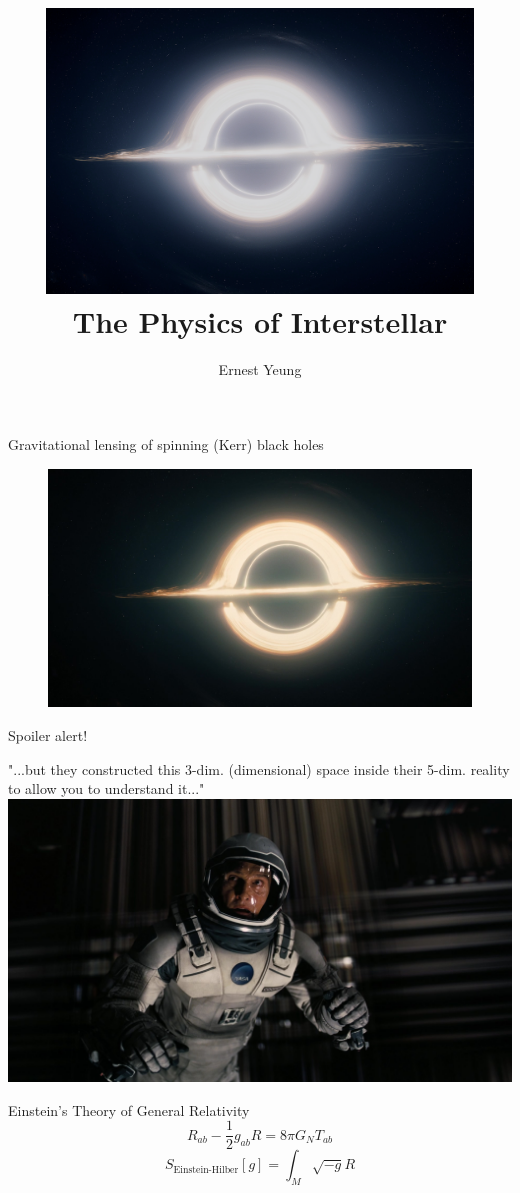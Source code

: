\documentclass{beamer}
\title{
	\centering\includegraphics[width=0.85\textwidth]{images/ut_interstellarOpener_f.png}\\	
	The Physics of Interstellar
}
\author{Ernest Yeung}
\begin{document}
	\begin{frame}
		\titlepage
	\end{frame}
	\begin{frame}{Gravitational lensing of spinning (Kerr) black holes}
		\begin{figure}
			\includegraphics[width=\textwidth]{images/1200899.jpg}
		\end{figure}
	\end{frame}
	\begin{frame}
		Spoiler alert!
	\end{frame}
	\begin{frame}{"...but they constructed this 3-dim. (dimensional) space inside their 5-dim. reality to allow you to understand it..."}
			\includegraphics[width=\textwidth]{images/1201308.jpg}		
	\end{frame}
	\begin{frame}{Einstein's Theory of General Relativity}
		\begin{equation*}
			R_{ab} - \frac{1}{2} g_{ab} R = 8\pi G_N T_{ab}
		\end{equation*}
		\begin{equation*}
			S_{\text{Einstein-Hilber}}[g] = \int_M \sqrt{-g} R
		\end{equation*}
	\end{frame}
\end{document}
